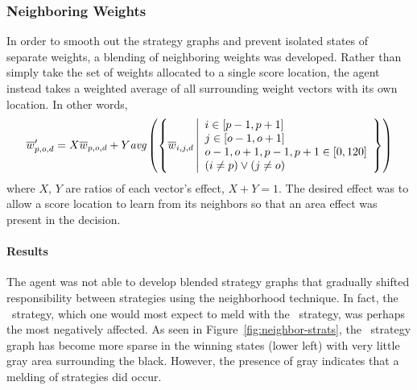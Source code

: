 

\subsubsection*{Neighboring Weights}
\label{sec:findings-expts-neighbors}


In order to smooth out the strategy graphs
and prevent isolated states of separate weights,
a blending of neighboring weights was developed.
%
Rather than simply take the set of weights allocated to a single score location,
the agent instead takes a weighted average of all surrounding weight vectors
with its own location.
%
In other words,
\[
    \wvecm'_{p,o,d} = %
    X\wvecm_{p,o,d} +
    Y \textit{avg}\left(\left\{
        \wvecm_{i,j,d}\,
        \middle|
        \begin{array}{ll}
        i \in [p-1,p+1]\\
        j \in [o-1, o+1]\\
        o-1,o+1,p-1,p+1 \in [0,120]\\
        (i \neq p) \lor (j \neq o)
        \end{array}
        \right\} %
    \right)
\]
where $X$, $Y$ are ratios of each vector's effect, $X+Y = 1$.
%
The desired effect was to allow a score location to learn from its neighbors
so that an area effect was present in the decision.


\paragraph*{Results}





The agent was not
able to develop blended strategy graphs
that gradually shifted responsibility between strategies
using the neighborhood technique.
%
In fact,
the \handmaxavg\ strategy,
which one would most expect to meld with the
\handmaxmin\ strategy,
was perhaps the most negatively affected.
%
As seen in Figure~\ref{fig:neighbor-strats},
the \handmaxavg\ strategy graph has become more sparse in the winning
states (lower left)
with very little gray area surrounding the black.
%
However,
the presence of gray
indicates that a melding of strategies did occur.

